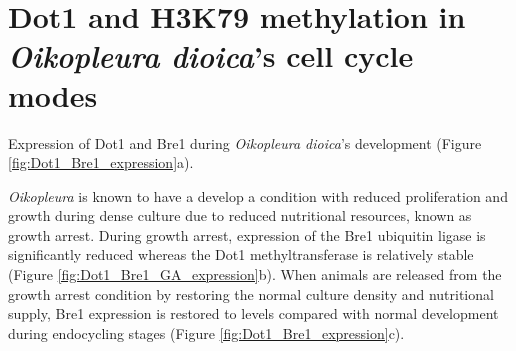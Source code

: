 \documentclass[11pt,twoside,a4paper]{report}
\begin{document}
\section{Dot1 and H3K79 methylation in \textit{Oikopleura dioica}'s cell cycle modes}
	
	Expression of Dot1 and Bre1 during \textit{Oikopleura dioica}'s development (Figure \ref{fig:Dot1_Bre1_expression}a).
	
	\textit{Oikopleura} is known to have a develop a condition with reduced proliferation and growth during dense culture due to reduced nutritional resources, known as growth arrest.  During growth arrest, expression of the Bre1 ubiquitin ligase is significantly reduced whereas the Dot1 methyltransferase is relatively stable (Figure \ref{fig:Dot1_Bre1_GA_expression}b). When animals are released from the growth arrest condition by restoring the normal culture density and nutritional supply, Bre1 expression is restored to levels compared with normal development during endocycling stages (Figure \ref{fig:Dot1_Bre1_expression}c).	
	
\end{document}
